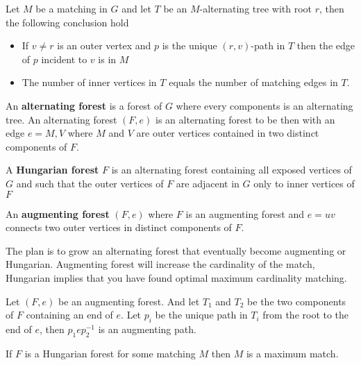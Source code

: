 			\begin{lemma}
				Let $M$ be a matching in $G$ and let $T$ be an $M$-alternating tree with root $r$, then the following conclusion hold
				\begin{itemize}
					\item If $v \neq r$ is an outer vertex and $p$ is the unique $(r,v)$-path in $T$ then the edge of $p$ incident to $v$ is in $M$
					\item The number of inner vertices in $T$ equals the number of matching edges in $T$.
				\end{itemize}
			\end{lemma}

			\begin{definition}
				An \textbf{alternating forest} is a forest of $G$ where every components is an alternating tree. An alternating forest $(F, e)$ is an alternating forest to be then with an edge $e = M, V$ where $M$ and $V$ are outer vertices contained in two distinct components of $F$.
			\end{definition}

			\begin{example}
				A \textbf{Hungarian forest} $F$ is an alternating forest containing all exposed vertices of $G$ and such that the outer vertices of $F$ are adjacent in $G$ only to inner vertices of $F$
			\end{example}

			\begin{definition}
				An \textbf{augmenting forest} $(F, e)$ where $F$ is an augmenting forest and $e = uv$ connects two outer vertices in distinct components of $F$.
			\end{definition}

			The plan is to grow an alternating forest that eventually become augmenting or Hungarian. Augmenting forest will increase the cardinality of the match, Hungarian implies that you have found optimal maximum cardinality matching.

			\begin{theorem}
				Let $(F, e)$ be an augmenting forest. And let $T_1$ and $T_2$ be the two components of $F$ containing an end of $e$. Let $p_i$ be the unique path in $T_i$ from the root to the end of $e$, then $p_1ep_2^{-1}$ is an augmenting path.
			\end{theorem}

			\begin{theorem}
				If $F$ is a Hungarian forest for some matching $M$ then $M$ is a maximum match.
			\end{theorem}

